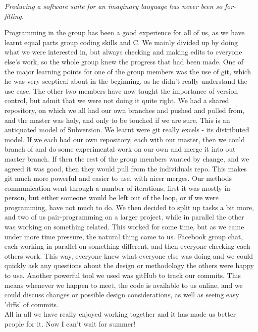 \documentclass[11pt]{report}
\begin{document}
\begin{center}\textit{Producing a software suite for an imaginary language has never been so for-filling.} \end{center}
Programming in the group has been a good experience for all of us, as we have 
learnt equal parts group coding skills and C. We mainly divided up by doing 
what we were interested in, but always checking and making edits to everyone 
else's work, so the whole group knew the progress that had been made. One of 
the major learning points for one of the group members was the use of git, which 
he was very sceptical about in the beginning, as he didn't really understand the 
use case. The other two members have now taught the importance of version 
control, but admit that we were not doing it quite right. We had a shared 
repository, on which we all had our own branches and pushed and pulled from, 
and the master was holy, and only to be touched if we are sure. This is an 
antiquated model of Subversion. We learnt were git really excels -  its 
distributed model. If we each had our own repository, each with our master, 
then we could branch of and do some experimental work on our own and merge it 
into out master branch. If then the rest of the group members wanted by change, 
and we agreed it was good, then they would pull from the individuals repo. This 
makes git much more powerful and easier to use, with nicer merges. Our methods 
communication went through a number of iterations, first it was mostly 
in-person, but either someone would be left out of the loop, or if we were 
programming, have not much to do. We then decided to split up tasks a bit more, 
and two of us pair-programming on a larger project, while in parallel the other 
was working on something related. This worked for some time, but as we came 
under more time pressure, the natural thing came to us. Facebook group chat, 
each working in parallel on something different, and then everyone checking each 
others work. This way, everyone knew what everyone else was doing and we could 
quickly ask any questions about the design or methodology the others were happy 
to use. Another powerful tool we used was gitHub to track our commits. This 
means whenever we happen to meet, the code is available to us online, and we 
could discuss changes or possible design considerations, as well as seeing easy 
'diffs' of commits.\\
All in all we have really enjoyed working together and it has made us better people for it. Now I can't wait for summer!
\end{document}
